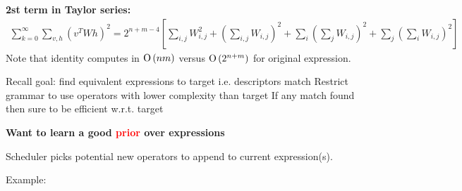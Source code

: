 \documentclass[landscape,a0b]{a0poster_csml_v2}
\begin{document}
\begin{poster}
\begin{PosterColumn}
  {\bf 2st term in Taylor series:}
  \begin{align*}
    \sum_{k=0}^\infty \sum_{v,h} (v^TWh)^2 = 2^{n + m - 4} [\sum_{i, j}W_{i, j}^2 + (\sum_{i, j} W_{i, j})^2 + \sum_i (\sum_j W_{i, j})^2 + \sum_j (\sum_i W_{i, j})^2]
  \end{align*}
  Note that identity computes in $\operatorname{O}\left(nm\right)$ versus $\operatorname{O}\left(2^{n + m}\right)$ for original expression.
\vspace{0.7cm}



Recall goal: find equivalent expressions to target
i.e. descriptors match
Restrict grammar to use operators with lower complexity than target
If any match found then sure to be efficient w.r.t. target

\begin{center}
{\bf Want to learn a good \textcolor{red}{prior} over expressions}
\end{center}


\textcolor{anublue}{Scheduler} picks potential new operators to append to current expression(s).

Example:


\end{PosterColumn}
\end{poster}
\end{document}
